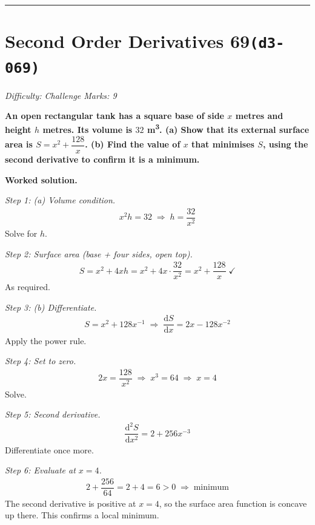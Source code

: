 \documentclass[11pt]{article}
\newcommand{\question}[1]{\par\medskip\noindent\textbf{#1}\par}
\begin{document}
\medskip\hrule

\section*{Second Order Derivatives 69\quad\small\texttt{(d3-069)}}
\textit{Difficulty: Challenge \quad\textbar\quad Marks: 9}

\question{An open rectangular tank has a square base of side \( x \) metres and height \( h \) metres. Its volume is \( 32 \) m\textsuperscript{3}. (a) Show that its external surface area is \( S = x^2 + \dfrac{128}{x} \). (b) Find the value of \( x \) that minimises \( S \), using the second derivative to confirm it is a minimum.}

\textbf{Worked solution.}

\textit{Step 1: (a) Volume condition.}
\[\begin{gathered}
x^2 h = 32 \;\Rightarrow\; h = \dfrac{32}{x^2}
\end{gathered}\]
Solve for \( h \).

\textit{Step 2: Surface area (base + four sides, open top).}
\[\begin{gathered}
S = x^2 + 4xh = x^2 + 4x \cdot \dfrac{32}{x^2} = x^2 + \dfrac{128}{x} \;\checkmark
\end{gathered}\]
As required.

\textit{Step 3: (b) Differentiate.}
\[\begin{gathered}
S = x^2 + 128 x^{-1} \;\Rightarrow\; \dfrac{\mathrm{d}S}{\mathrm{d}x} = 2x - 128 x^{-2}
\end{gathered}\]
Apply the power rule.

\textit{Step 4: Set to zero.}
\[\begin{gathered}
2x = \dfrac{128}{x^2} \;\Rightarrow\; x^3 = 64 \;\Rightarrow\; x = 4
\end{gathered}\]
Solve.

\textit{Step 5: Second derivative.}
\[\begin{gathered}
\dfrac{\mathrm{d}^2S}{\mathrm{d}x^2} = 2 + 256 x^{-3}
\end{gathered}\]
Differentiate once more.

\textit{Step 6: Evaluate at \( x = 4 \).}
\[\begin{gathered}
2 + \dfrac{256}{64} = 2 + 4 = 6 > 0 \; \Rightarrow \; \text{minimum}
\end{gathered}\]
The second derivative is positive at \(x = 4\), so the surface area function is concave up there. This confirms a local minimum.
\end{document}
